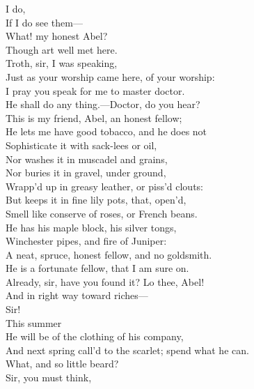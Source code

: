 \documentclass[a4paper,oneside]{memoir}
\begin{document}
\begin{drama*}
\subtlespeaks {} I do,\\
If I do see them---\\
\facespeaks {} What! my honest Abel?\\
Though art well met here.\\
\druggerspeaks {} Troth, sir, I was speaking,\\
Just as your worship came here, of your worship:\\
I pray you speak for me to master doctor.\\
\facespeaks He shall do any thing.---Doctor, do you hear?\\
This is my friend, Abel, an honest fellow;\\
He lets me have good tobacco, and he does not\\
Sophisticate it with sack-lees or oil,\\
Nor washes it in muscadel and grains,\\
Nor buries it in gravel, under ground,\\
Wrapp'd up in greasy leather, or piss'd clouts:\\
But keeps it in fine lily pots, that, open'd,\\
Smell like conserve of roses, or French beans.\\
He has his maple block, his silver tongs,\\
Winchester pipes, and fire of Juniper:\\
A neat, spruce, honest fellow, and no goldsmith.\\
\subtlespeaks He is a fortunate fellow, that I am sure on.\\
\facespeaks Already, sir, have you found it? Lo thee, Abel!\\
\subtlespeaks And in right way toward riches---\\
\facespeaks {} Sir!\\
\subtlespeaks {} This summer\\
He will be of the clothing of his company,\\
And next spring call'd to the scarlet; spend what he can.\\
\facespeaks What, and so little beard?\\
\subtlespeaks {} Sir, you must think,\\

\end{drama*}
\end{document}
